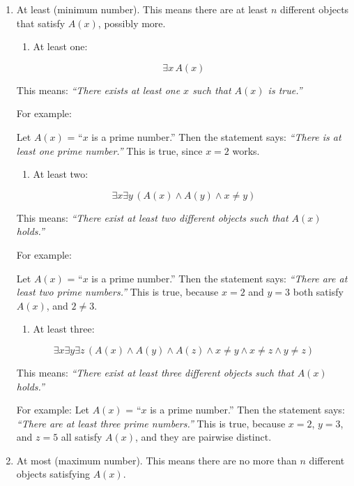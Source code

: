 \begin{enumerate}
\def\labelenumi{\arabic{enumi}.}
\item
  At least (minimum number). This means there are at least \(n\)
  different objects that satisfy \(A(x)\), possibly more.

  \begin{enumerate}
  \def\labelenumii{\alph{enumii})}
  \tightlist
  \item
    At least one:
  \end{enumerate}

  \[
   \exists x \, A(x)
   \]

  This means: \emph{``There exists at least one \(x\) such that \(A(x)\)
  is true.''}

  For example:

  Let \(A(x)\) = ``\(x\) is a prime number.'' Then the statement says:
  \emph{``There is at least one prime number.''} This is true, since
  \(x = 2\) works.

  \begin{enumerate}
  \def\labelenumii{\alph{enumii})}
  \setcounter{enumii}{1}
  \tightlist
  \item
    At least two:
  \end{enumerate}

  \[
   \exists x \exists y \, (A(x) \land A(y) \land x \neq y)
   \]

  This means: \emph{``There exist at least two different objects such
  that \(A(x)\) holds.''}

  For example:

  Let \(A(x)\) = ``\(x\) is a prime number.'' Then the statement says:
  \emph{``There are at least two prime numbers.''} This is true, because
  \(x = 2\) and \(y = 3\) both satisfy \(A(x)\), and \(2 \neq 3\).

  \begin{enumerate}
  \def\labelenumii{\alph{enumii})}
  \setcounter{enumii}{2}
  \tightlist
  \item
    At least three:
  \end{enumerate}

  \[
   \exists x \exists y \exists z \, (A(x) \land A(y) \land A(z) \land x \neq y \land x \neq z \land y \neq z)
   \]

  This means: \emph{``There exist at least three different objects such
  that \(A(x)\) holds.''}

  For example: Let \(A(x)\) = ``\(x\) is a prime number.'' Then the
  statement says: \emph{``There are at least three prime numbers.''}
  This is true, because \(x = 2\), \(y = 3\), and \(z = 5\) all satisfy
  \(A(x)\), and they are pairwise distinct.
\item
  At most (maximum number). This means there are no more than \(n\)
  different objects satisfying \(A(x)\).


\end{enumerate}
